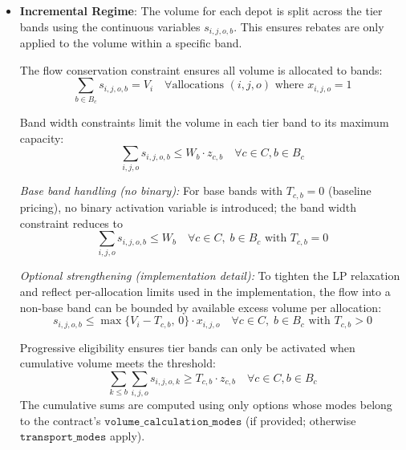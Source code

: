 \begin{itemize}
    Base option exclusion is then enforced \emph{per contract} by:
    \begin{equation}
    x_{i,j,o}^{\text{base}} \le 1 - y_{c,\text{any}} \quad \forall \text{base options } o \text{ in contract } c \label{eq:base-exclusion-contract}
    \end{equation}
    \item \textbf{Incremental Regime}: The volume for each depot is split across the tier bands using the continuous variables $s_{i,j,o,b}$. This ensures rebates are only applied to the volume within a specific band.
    
    The flow conservation constraint ensures all volume is allocated to bands:
    \begin{equation}
    \sum_{b\in B_c} s_{i,j,o,b} = V_i \quad \forall \text{allocations } (i,j,o) \text{ where } x_{i,j,o} = 1 \label{eq:flow-conservation}
    \end{equation}
    
    Band width constraints limit the volume in each tier band to its maximum capacity:
    \begin{equation}
    \sum_{i,j,o} s_{i,j,o,b} \le W_b \cdot z_{c,b} \quad \forall c \in C, b \in B_c \label{eq:band-width}
    \end{equation}

    \textit{Base band handling (no binary):} For base bands with $T_{c,b}=0$ (baseline pricing), no binary activation variable is introduced; the band width constraint reduces to
    \begin{equation}
    \sum_{i,j,o} s_{i,j,o,b} \le W_b \quad \forall c \in C,\; b \in B_c \text{ with } T_{c,b}=0 \label{eq:band-width-base}
    \end{equation}

    \textit{Optional strengthening (implementation detail):} To tighten the LP relaxation and reflect per-allocation limits used in the implementation, the flow into a non-base band can be bounded by available excess volume per allocation:
    \begin{equation}
    s_{i,j,o,b} \le \max\{V_i - T_{c,b},\,0\} \cdot x_{i,j,o} \quad \forall c \in C,\; b \in B_c \text{ with } T_{c,b}>0 \label{eq:band-excess-limit}
    \end{equation}
    
    Progressive eligibility ensures tier bands can only be activated when cumulative volume meets the threshold:
    \begin{equation}
    \sum_{k \le b} \sum_{i,j,o} s_{i,j,o,k} \ge T_{c,b} \cdot z_{c,b} \quad \forall c \in C, b \in B_c \label{eq:cumulative-threshold}
    \end{equation}
    The cumulative sums are computed using only options whose modes belong to the contract's $\texttt{volume\_calculation\_modes}$ (if provided; otherwise $\texttt{transport\_modes}$ apply).
    

\end{itemize}
